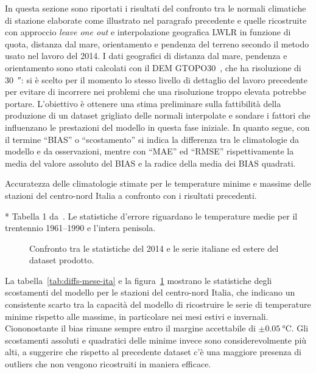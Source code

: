 In questa sezione sono riportati i risultati del confronto tra le normali climatiche di stazione elaborate come illustrato nel paragrafo precedente e quelle ricostruite con approccio \emph{leave one out} e interpolazione geografica LWLR in funzione di quota, distanza dal mare, orientamento e pendenza del terreno secondo il metodo usato nel lavoro del 2014. I dati geografici di distanza dal mare, pendenza e orientamento sono stati calcolati con il DEM GTOPO30~\cite{geschNewLandSurface1999}, che ha risoluzione di \qty{30}{\arcsecond}: si è scelto per il momento lo stesso livello di dettaglio del lavoro precedente per evitare di incorrere nei problemi che una risoluzione troppo elevata potrebbe portare. L'obiettivo è ottenere una stima preliminare sulla fattibilità della produzione di un dataset grigliato delle normali interpolate e sondare i fattori che influenzano le prestazioni del modello in questa fase iniziale. In quanto segue, con il termine ``BIAS'' o ``scostamento'' si indica la differenza tra le climatologie da modello e da osservazioni, mentre con ``MAE'' ed ``RMSE'' rispettivamente la media del valore assoluto del BIAS e la radice della media dei BIAS quadrati.

\begin{table}[ht]
  \centering
  \begin{adjustbox}{max width=\textwidth}
    \begin{threeparttable}
      \caption{Accuratezza delle climatologie stimate per le temperature minime e massime delle stazioni del centro-nord Italia a confronto con i risultati precedenti.}\label{tab:diffs-mese-ita}
      
      \begin{tablenotes}
      \item[*] Tabella 1 da~\cite[p.~10]{brunettiHighresolutionTemperatureClimatology2014}. Le statistiche d'errore riguardano le temperature medie per il trentennio 1961--1990 e l'intera penisola.
      \end{tablenotes}
    \end{threeparttable}
  \end{adjustbox}
\end{table}

\begin{figure}[ht]
  \centering
  
  \caption{Confronto tra le statistiche del 2014 e le serie italiane ed estere del dataset prodotto.}\label{fig:diffs-mese-ita}
\end{figure}
La tabella~\ref{tab:diffs-mese-ita} e la figura~\ref{fig:diffs-mese-ita} mostrano le statistiche degli scostamenti del modello per le stazioni del centro-nord Italia, che indicano un consistente scarto tra la capacità del modello di ricostruire le serie di temperature minime rispetto alle massime, in particolare nei mesi estivi e invernali. Ciononostante il bias rimane sempre entro il margine accettabile di \(\pm\qty{0.05}{\degreeCelsius}\). Gli scostamenti assoluti e quadratici delle minime invece sono considerevolmente più alti, a suggerire che rispetto al precedente dataset c'è una maggiore presenza di outliers che non vengono ricostruiti in maniera efficace.

